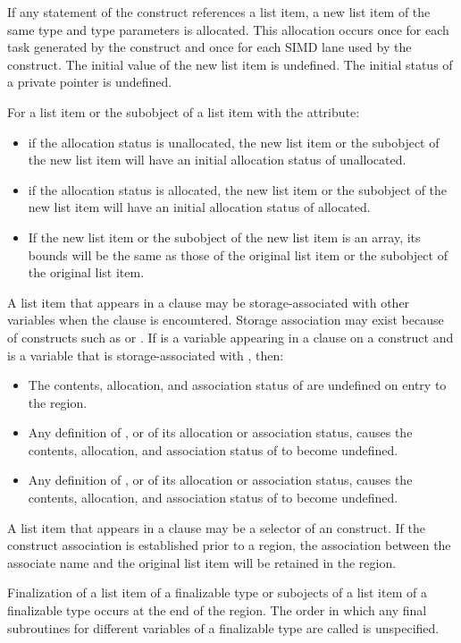 \begin{fortranspecific}
If any statement of the construct references a list item, a new list
item of the same type and type parameters is allocated. This
allocation occurs once for each task generated by the construct and
once for each SIMD lane used by the construct. The initial value of
the new list item is undefined. The initial status of a private
pointer is undefined.

For a list item or the subobject of a list item with the  attribute:

\begin{itemize}
\item if the allocation status is unallocated, the new list item or the subobject
of the new list item will have an initial allocation status of unallocated.

\item if the allocation status is allocated, the new list item or the subobject of
the new list item will have an initial allocation status of allocated.

\item If the new list item or the subobject of the new list item is an array, its bounds will be
the same as those of the original list item or the subobject of the original list item.
\end{itemize}

A list item that appears in a  clause may be storage-associated with other
variables when the  clause is encountered. Storage association may exist
because of constructs such as  or . If  is a variable appearing
in a  clause on a construct and  is a variable that is storage-associated with , then:

\begin{itemize}
\item The contents, allocation, and association status of  are undefined on entry to the region.

\item Any definition of , or of its allocation or association status, causes the contents,
allocation, and association status of  to become undefined.

\item Any definition of , or of its allocation or association status, causes the contents,
allocation, and association status of  to become undefined.
\end{itemize}

A list item that appears in a  clause may be a selector of an 
construct. If the construct association is established prior to a  region, the
association between the associate name and the original list item will be retained in the
region.

Finalization of a list item of a finalizable type or subojects of a
list item of a finalizable type occurs at the end of the region. The
order in which any final subroutines for different variables of a
finalizable type are called is unspecified.
\end{fortranspecific}

